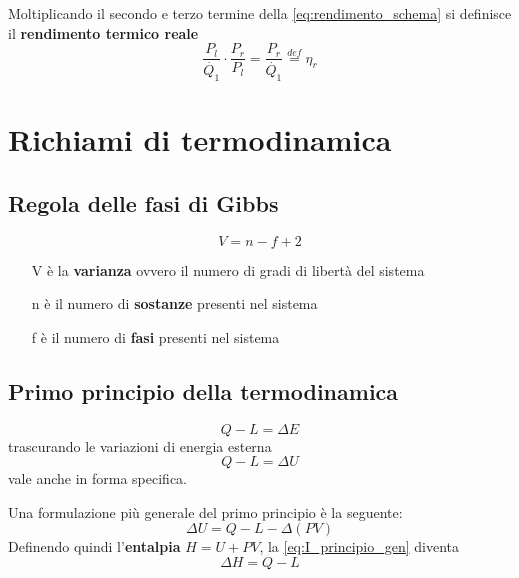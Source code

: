 \documentclass[a4paper,10pt]{article}
\begin{document}
Moltiplicando il secondo e terzo termine della \eqref{eq:rendimento_schema} si 
definisce il \textbf{rendimento termico reale}
\begin{equation}
\label{eq:rendimento_reale}
 \frac{P_l}{\dot{Q_1}}\cdot \frac{P_r}{P_l} = \frac{P_r}{\dot{Q_1}} \stackrel{def}{=} 
 \eta_r
\end{equation}

\section{Richiami di termodinamica}
\label{sec:termodinamica}
\subsection{Regola delle fasi di Gibbs}
\begin{equation}
 \label{eq:fasi_gibbs}
 V = n - f + 2
\end{equation}
\begin{itemize}
\item[V] è la \textbf{varianza} ovvero il numero di gradi di libertà del sistema
\item[n] è il numero di \textbf{sostanze} presenti nel sistema
\item[f] è il numero di \textbf{fasi} presenti nel sistema
\end{itemize}
\subsection{Primo principio della termodinamica}
\label{subsec:primo_principio}
\begin{equation}
Q - L = \Delta E
\end{equation}
trascurando le variazioni di energia esterna
\begin{equation}
Q - L = \Delta U
\end{equation}
vale anche in forma specifica.

Una formulazione più generale del primo principio è la seguente:
\begin{equation}
\label{eq:I_principio_gen}
\Delta U = Q - L - \Delta(PV)
\end{equation}
Definendo quindi l'\textbf{entalpia} \(H = U+PV\), la \eqref{eq:I_principio_gen} diventa
\begin{equation}
\label{eq:I_principio_aperti}
\Delta H = Q - L
\end{equation}
\end{document}
